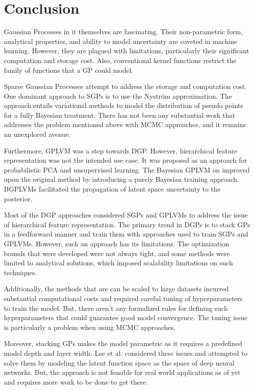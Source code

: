 \documentclass[letterpaper,11pt]{extarticle}
\begin{document}
\section{Conclusion}
Gaussian Processes in it themselves are fascinating. Their non-parametric form, analytical properties, and ability to model uncertainty are coveted in machine learning. However, they are plagued with limitations, particularly their significant computation and storage cost. Also, conventional kernel functions restrict the family of functions that a GP could model. 

Sparse Gaussian Processes attempt to address the storage and computation cost. One dominant approach to SGPs is to use the Nyström approximation. The approach entails variational methods to model the distribution of pseudo points for a fully Bayesian treatment. There has not been any substantial work that addresses the problem mentioned above with MCMC approaches, and it remains an unexplored avenue.

Furthermore, GPLVM was a step towards DGP. However, hierarchical feature representation was not the intended use case. It was proposed as an approach for probabilistic PCA and unsupervised learning. The Bayesian GPLVM on improved upon the original method by introducing a purely Bayesian training approach. BGPLVMs facilitated the propagation of latent space uncertainty to the posterior. 

Most of the DGP approaches considered SGPs and GPLVMs to address the issue of hierarchical feature representation. The primary trend in DGPs is to stack GPs in a feedforward manner and train them with approaches used to train SGPs and GPLVMs. However, such an approach has its limitations. The optimization bounds that were developed were not always tight, and some methods were limited to analytical solutions, which imposed scalability limitations on such techniques. 

Additionally, the methods that are can be scaled to large datasets incurred substantial computational costs and required careful tuning of hyperparameters to train the model. But, there aren't any formalized rules for defining such hyperparameters that could guarantee good model convergence. The tuning issue is particularly a problem when using MCMC approaches. 

Moreover, stacking GPs makes the model parametric as it requires a predefined model depth and layer width. Lee et al. \cite{LeeBNSPD18} considered these issues and attempted to solve them by modeling the latent function space as the space of deep neural networks. But, the approach is not feasible for real world applications as of yet and requires more work to be done to get there. 
\end{document}
